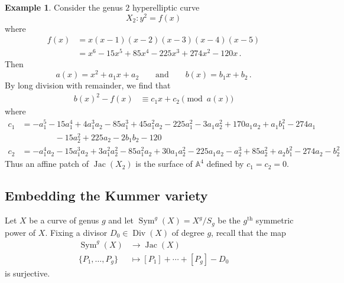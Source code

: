 \documentclass[reqno, 12pt]{amsart}
\theoremstyle{definition}
\newtheorem{eg} [thm] {Example}
\newcommand{\A}{\mathbb A}
\DeclareMathOperator{\Jac}{Jac}
\DeclareMathOperator{\Div}{Div}
\DeclareMathOperator{\Sym}{Sym}
\begin{document}
\begin{eg}
Consider the genus $2$ hyperelliptic curve
$$
X_2: y^2 = f(x)
$$
where
\begin{align*}
f(x) &= x (x-1) (x-2) (x-3) (x-4) (x-5)\\
	&= x^6 - 15 x^5 + 85 x^4 - 225 x^3 + 274 x^2 - 120 x \, .
\end{align*}
Then
$$
a(x) = x^2 + a_1 x + a_2 \qquad \text{and} \qquad b(x) = b_1 x + b_2 \, .
$$
By long division with remainder, we find that
\begin{align*}
b(x)^2 - f(x) &\equiv  c_1 x + c_2 \pmod{a(x)}
\end{align*}
where
\begin{align*}
c_1 &= -a_1^5 - 15 a_1^4 + 4 a_1^3 a_2 - 85 a_1^3 + 45 a_1^2 a_2 - 225 a_1^2 - 3 a_1 a_2^2 + 170 a_1 a_2 + a_1 b_1^2 - 274 a_1\\
	&\qquad \qquad - 15 a_2^2 + 225 a_2 - 2 b_1 b_2 - 120\\
c_2 &= - a_1^4 a_2 - 15 a_1^3 a_2 + 3 a_1^2 a_2^2 - 85 a_1^2 a_2 + 30 a_1 a_2^2 - 225 a_1 a_2 - a_2^3 + 85 a_2^2 + a_2 b_1^2 - 274 a_2 - b_2^2
\end{align*}
Thus an affine patch of $\Jac(X_2)$ is the surface of $\A^4$ defined by $c_1 = c_2 = 0$.
\end{eg}

\subsection{Embedding the Kummer variety}
Let $X$ be a curve of genus $g$ and let $\Sym^g(X) = X^g/S_g$ be the $g^\text{th}$ symmetric power of $X$. Fixing a divisor $D_0 \in \Div(X)$ of degree $g$, recall that the map
\begin{align*}
\Sym^g(X) &\to \Jac(X)\\
\{P_1, \ldots, P_g\} &\mapsto [P_1] + \cdots + [P_g] - D_0
\end{align*}
is surjective.
\end{document}
